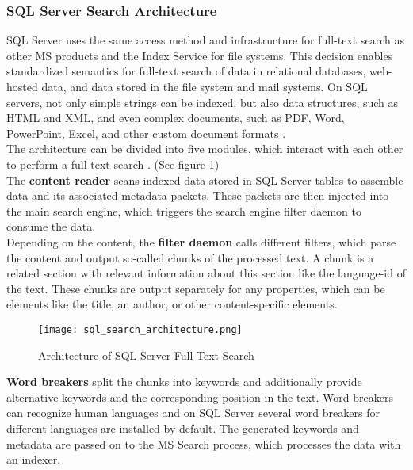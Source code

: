 \subsubsection{SQL Server Search Architecture}
\ac{SQL} Server uses the same access method and infrastructure for full-text search as other \ac{MS} products and the Index Service for file systems. This decision enables standardized semantics for full-text search of data in relational databases, web-hosted data, and data stored in the file system and mail systems. On \ac{SQL} servers, not only simple strings can be indexed, but also data structures, such as HTML and XML, and even complex documents, such as PDF, Word, PowerPoint, Excel, and other custom document formats \parencite[cf.][p. 7]{hamilton_microsoft_2001}.\\
The architecture can be divided into five modules, which interact with each other to perform a full-text search \parencite[cf.][pp. 8-9]{hamilton_microsoft_2001}. (See figure \ref{fig:sql_search_architecture})\\
The \textbf{content reader} scans indexed data stored in \ac{SQL} Server tables to assemble data and its associated metadata packets. These packets are then injected into the main search engine, which triggers the search engine filter daemon to consume the data.\\
Depending on the content, the \textbf{filter daemon} calls different filters, which parse the content and output so-called chunks of the processed text. A chunk is a related section with relevant information about this section like the language-id of the text. These chunks are output separately for any properties, which can be elements like the title, an author, or other content-specific elements.
\begin{figure}[H]
    \caption{Architecture of SQL Server Full-Text Search}
    \label{fig:sql_search_architecture}
    \texttt{[image: sql\_search\_architecture.png]}
    \\
    \cite[Source:][p. 8]{hamilton_microsoft_2001}
\end{figure}
\textbf{Word breakers} split the chunks into keywords and additionally provide alternative keywords and the corresponding position in the text. Word breakers can recognize human languages and on \ac{SQL} Server several word breakers for different languages are installed by default. The generated keywords and metadata are passed on to the \ac{MS} Search process, which processes the data with an indexer.\\
